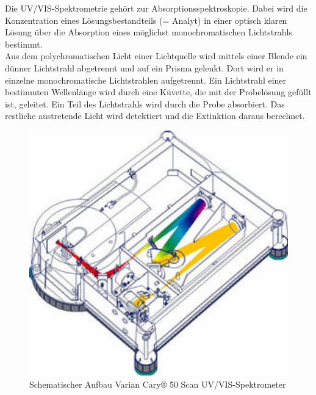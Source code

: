 Die UV/VIS-Spektrometrie gehört zur Absorptionsspektroskopie. Dabei wird die Konzentration
eines Lösungsbestandteils (= Analyt) in einer optisch klaren Lösung über die Absorption
eines möglichst monochromatischen Lichtstrahls bestimmt.\\
Aus dem polychromatischen Licht einer Lichtquelle wird mittels einer Blende ein dünner
Lichtstrahl abgetrennt und auf ein Prisma gelenkt. Dort wird er in einzelne monochromatische
Lichtstrahlen aufgetrennt. Ein Lichtstrahl einer bestimmten Wellenlänge wird
durch eine Küvette, die mit der Probelösung gefüllt ist, geleitet. Ein Teil des Lichtstrahls wird
durch die Probe absorbiert. Das restliche austretende Licht wird detektiert und die Extinktion
daraus berechnet.
\begin{figure}[htbp]
	\centering
		\includegraphics[width=1.00\textwidth]{../Bilder/AufbauSpektrometer.jpg}
	\caption{Schematischer Aufbau Varian Cary® 50 Scan UV/VIS-Spektrometer \cite{UV-VIS}}
	\label{fig:AufbauSpektrometer}
\end{figure}

